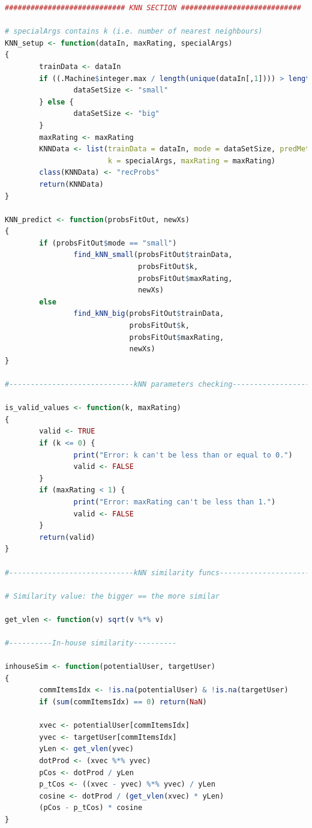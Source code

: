 \documentclass{article}
\begin{document}
\begin{lstlisting}[language=R]
############################ KNN SECTION ############################

# specialArgs contains k (i.e. number of nearest neighbours)
KNN_setup <- function(dataIn, maxRating, specialArgs)
{
        trainData <- dataIn
        if ((.Machine$integer.max / length(unique(dataIn[,1]))) > length(unique(dataIn[,2]))) {
                dataSetSize <- "small"
        } else {
                dataSetSize <- "big"
        }
        maxRating <- maxRating
        KNNData <- list(trainData = dataIn, mode = dataSetSize, predMethod = "kNN",
                        k = specialArgs, maxRating = maxRating)
        class(KNNData) <- "recProbs"
        return(KNNData)
}

KNN_predict <- function(probsFitOut, newXs)
{
        if (probsFitOut$mode == "small")
                find_kNN_small(probsFitOut$trainData,
                               probsFitOut$k,
                               probsFitOut$maxRating,
                               newXs)
        else
                find_kNN_big(probsFitOut$trainData,
                             probsFitOut$k,
                             probsFitOut$maxRating,
                             newXs)
}

#-----------------------------kNN parameters checking-----------------------------

is_valid_values <- function(k, maxRating)
{
        valid <- TRUE
        if (k <= 0) {
                print("Error: k can't be less than or equal to 0.")
                valid <- FALSE
        }
        if (maxRating < 1) {
                print("Error: maxRating can't be less than 1.")
                valid <- FALSE
        }
        return(valid)
}

#-----------------------------kNN similarity funcs-----------------------------

# Similarity value: the bigger == the more similar

get_vlen <- function(v) sqrt(v %*% v)

#----------In-house similarity----------

inhouseSim <- function(potentialUser, targetUser)
{
        commItemsIdx <- !is.na(potentialUser) & !is.na(targetUser)
        if (sum(commItemsIdx) == 0) return(NaN)

        xvec <- potentialUser[commItemsIdx]
        yvec <- targetUser[commItemsIdx]
        yLen <- get_vlen(yvec)
        dotProd <- (xvec %*% yvec)
        pCos <- dotProd / yLen
        p_tCos <- ((xvec - yvec) %*% yvec) / yLen
        cosine <- dotProd / (get_vlen(xvec) * yLen)
        (pCos - p_tCos) * cosine
}


\end{lstlisting}
\end{document}
